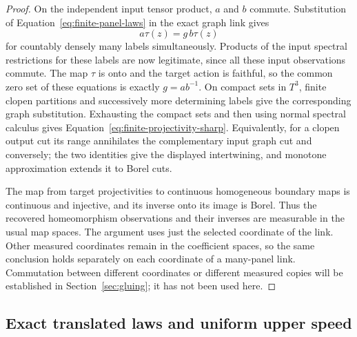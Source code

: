 \begin{proof}
On the independent input tensor product, $a$ and $b$ commute.
Substitution of Equation~\eqref{eq:finite-panel-laws} in the
exact graph link gives
\[
 a\tau(z)=g\,b\tau(z)
\]
for countably densely many labels simultaneously.  Products of
the input spectral restrictions for these labels are now
legitimate, since all these input observations commute.
The map $\tau$ is onto and the target action is faithful, so
the common zero set of these equations is exactly $g=ab^{-1}$.
On compact sets in $T^3$, finite clopen partitions and successively
more determining labels give the corresponding graph
substitution.  Exhausting the compact sets and then using normal
spectral calculus gives
Equation~\eqref{eq:finite-projectivity-sharp}.
Equivalently, for a clopen output cut its range annihilates the
complementary input graph cut and conversely; the two identities
give the displayed intertwining, and monotone approximation
extends it to Borel cuts.

The map from target projectivities to continuous homogeneous
boundary maps is continuous and injective, and its inverse onto
its image is Borel.  Thus the recovered homeomorphism
observations and their inverses are measurable in the usual
map spaces.  The argument uses just the selected coordinate of
the link.  Other measured coordinates remain in the coefficient
spaces, so the same conclusion holds separately on each
coordinate of a many-panel link.  Commutation between different
coordinates or different measured copies will be established in
Section~\ref{sec:gluing}; it has not been used here.
\end{proof}

\subsection{Exact translated laws and uniform upper speed}


